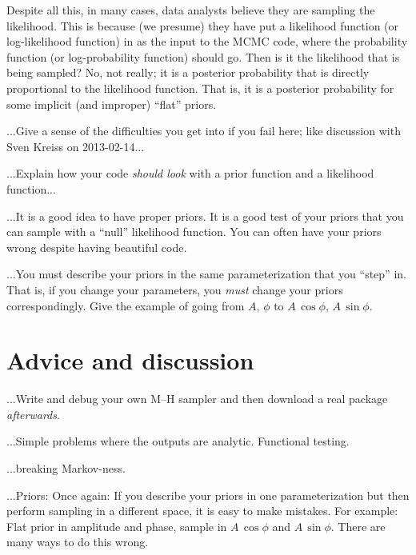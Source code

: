\documentclass[12pt,twoside,pdftex]{article}
\begin{document}
Despite all this, in many cases,
  data analysts believe they are sampling the likelihood.
This is because (we presume) they have put a likelihood function
  (or log-likelihood function)
  in as the input to the MCMC code, where the probability function
  (or log-probability function) should go.
Then is it the likelihood that is being sampled?
No, not really;
it is a posterior probability that is directly proportional to the likelihood function.
That is, it is a posterior probability for some implicit (and improper) ``flat'' priors.

...Give a sense of the difficulties you get into if you fail here; like
discussion with Sven Kreiss on 2013-02-14...

...Explain how your code \emph{should look} with a prior function and a likelihood function...

...It is a good idea to have proper priors.
It is a good test of your priors that you can sample with a ``null'' likelihood function.
You can often have your priors wrong despite having beautiful code.

...You must describe your priors in the same parameterization that you ``step'' in.
That is, if you change your parameters, you \emph{must} change your priors correspondingly.
Give the example of going from $A$, $\phi$ to $A\,\cos\phi$, $A\,\sin\phi$.

\section{Advice and discussion}

...Write and debug your own M--H sampler and then download a real
package \emph{afterwards}.

...Simple problems where the outputs are analytic.  Functional testing.

...breaking Markov-ness.

...Priors: Once again:
If you describe your priors in one parameterization but
then perform sampling in a different space, it is easy to make
mistakes.  For example: Flat prior in amplitude and phase, sample in
$A\,\cos\phi$ and $A\,\sin\phi$.  There are many ways to do this
wrong.
\end{document}
